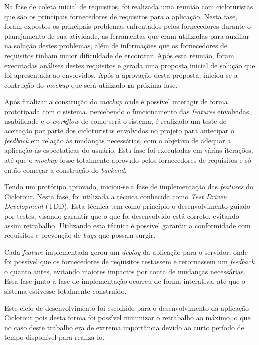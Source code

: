 Na fase de coleta inicial de requisitos, foi realizada uma reunião com cicloturistas que são os principais fornecedores de requisitos para a 
aplicação. Nesta fase, foram expostos os principais problemas enfrentados pelos fornecedores durante o planejamento de sua atividade, as 
ferramentas que eram utilizadas para auxiliar na solução destes problemas, além de informações que os fornecedores de requisitos tinham maior
dificuldade de encontrar. Após esta reunião, foram executadas análises destes requisitos e gerada uma proposta inicial de solução que foi apresentada
ao envolvidos. Após a aprovação desta proposta, iniciou-se a contrução do \textit{mockup} que será utilizado na próxima fase.

Após finalizar a construção do \textit{mockup} onde é possível interagir de forma prototipada com o sistema, percebendo o funcionamento das 
\textit{features} envolvidas, usabilidade e o \textit{workflow} de como será o sistema, é realizado um teste de aceitação por parte dos 
cicloturistas envolvidos no projeto para antecipar o \textit{feedback} em relação às mudanças necessárias, com o objetivo de adequar a aplicação às 
espectaticas do usuário. Esta fase foi executadas em várias iterações, até que o \textit{mockup} fosse totalmente aprovado pelos fornecedores de 
requisitos e só então começar a construção do \textit{backend}.

Tendo um protótipo aprovado, iniciou-se a fase de implementação das \textit{features} do Ciclotour. Nesta fase, foi utilizada a técnica conhecida 
como \textit{Test Driven Development} (TDD). Esta técnica tem como princípio o desenvolvimento guiado por testes, visando garantir que o que foi 
desenvolvido está correto, evitando assim retrabalho. Utilizando esta técnica é possível garantir a conformidade com requisitos e prevenção de 
\textit{bugs} que possam surgir. 

Cada \textit{feature} implementada gerou um \textit{deploy} da aplicação para o servidor, onde foi possível que os fornecedores de requisitos testassem
e retornassem um \textit{feedback} o quanto antes, evitando maiores impactos por conta de mudanças necessárias. Essa fase junto à fase de 
implementação ocorreu de forma interativa, até que o sistema estivesse totalmente construído.

Este ciclo de desenvolvimento foi escolhido para o desenvolvimento da aplicação Ciclotour pois desta forma foi possível minimizar o retrabalho ao 
máximo, o que no caso deste trabalho era de extrema importância devido ao curto período de tempo disponível para realiza-lo. 

